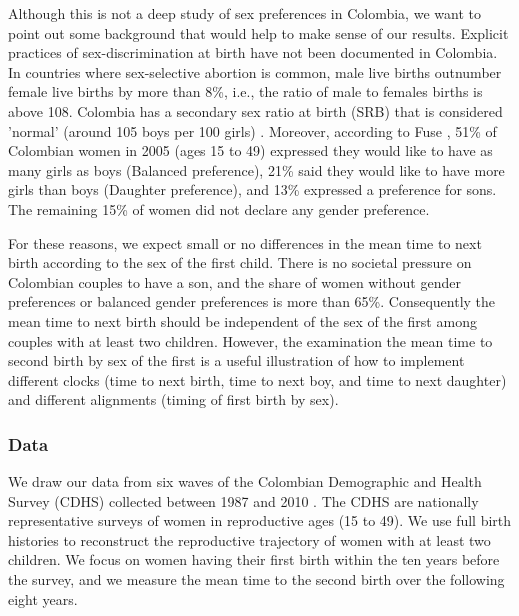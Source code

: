 \documentclass[a4paper,left=1.25cm,right=1.25cm,top=1.25cm,bottom=1.25cm]{article}
\begin{document}
  Although this is not a deep study of sex preferences in Colombia, we want to point out some background that would help to make sense of our results. Explicit practices of sex-discrimination at birth have not been documented in Colombia. In countries where sex-selective abortion is common, male live births outnumber female live births by more than 8\%, i.e., the ratio of male to females births is above 108. Colombia has a secondary sex ratio at birth (SRB) that is considered 'normal' (around 105 boys per 100 girls) \cite{bongaarts2013}. Moreover, according to Fuse \citeyear{fuse2010}, 51\% of Colombian women in 2005 (ages 15 to 49) expressed they would like to have as many girls as boys (Balanced preference), 21\% said they would like to have more girls than boys (Daughter preference), and 13\% expressed a preference for sons. The remaining 15\% of women did not declare any gender preference. 
 
  For these reasons, we expect small or no differences in the mean time to next birth according to the sex of the first child. There is no societal pressure on Colombian couples to have a son, and the share of women without gender preferences or balanced gender preferences is more than 65\%. Consequently the mean time to next birth should be independent of the sex of the first among couples with at least two children. However, the examination the mean time to second birth by sex of the first is a useful illustration of how to implement different clocks (time to next birth, time to next boy, and time to next daughter) and different alignments (timing of first birth by sex).
 
 
\subsubsection{Data}

We draw our data from six waves of the Colombian Demographic and Health Survey (CDHS) collected between 1987 and 2010 \citep{DHS}. The CDHS are nationally representative surveys of women in reproductive ages (15 to 49). We use full birth histories to reconstruct the reproductive trajectory of women with at least two children. We focus on women having their first birth within the ten years before the survey, and we measure the mean time to the second birth over the following eight years.
\end{document}

